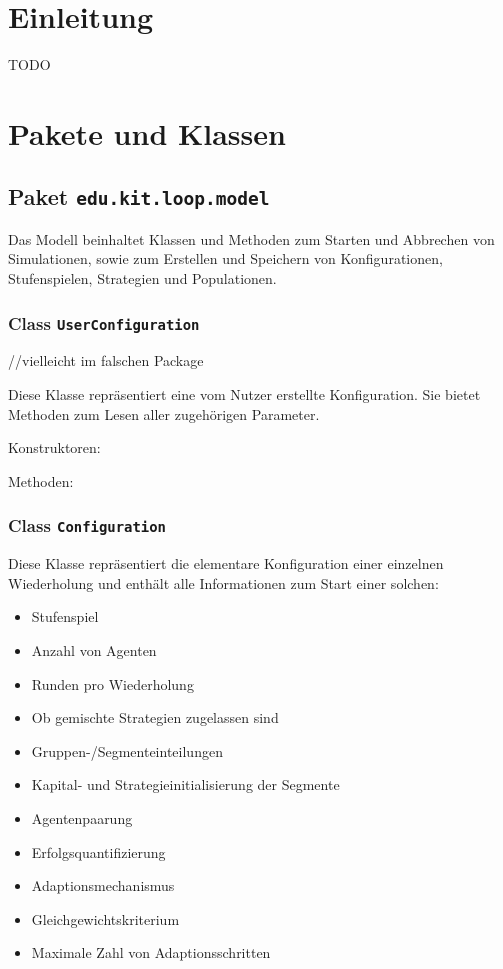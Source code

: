 \documentclass[parskip=full,11pt]{scrartcl}
\begin{document}
\section{Einleitung}
TODO

\section{Pakete und Klassen}
\subsection{Paket \texttt{edu.kit.loop.model}}
Das Modell beinhaltet Klassen und Methoden zum Starten und Abbrechen von Simulationen, sowie zum Erstellen und Speichern von Konfigurationen, Stufenspielen, Strategien und Populationen.

\subsubsection{Class \texttt{UserConfiguration}}
//vielleicht im falschen Package

Diese Klasse repräsentiert eine vom Nutzer erstellte Konfiguration. Sie bietet Methoden zum Lesen aller zugehörigen Parameter.

Konstruktoren:

Methoden:

\subsubsection{Class \texttt{Configuration}}
Diese Klasse repräsentiert die elementare Konfiguration einer einzelnen Wiederholung und enthält alle Informationen zum Start einer solchen:
\begin{itemize}\itemsep -10pt
\item Stufenspiel
\item Anzahl von Agenten
\item Runden pro Wiederholung
\item Ob gemischte Strategien zugelassen sind
\item Gruppen-/Segmenteinteilungen
\item Kapital- und Strategieinitialisierung der Segmente
\item Agentenpaarung
\item Erfolgsquantifizierung
\item Adaptionsmechanismus
\item Gleichgewichtskriterium
\item Maximale Zahl von Adaptionsschritten
\end{itemize}
\end{document}
